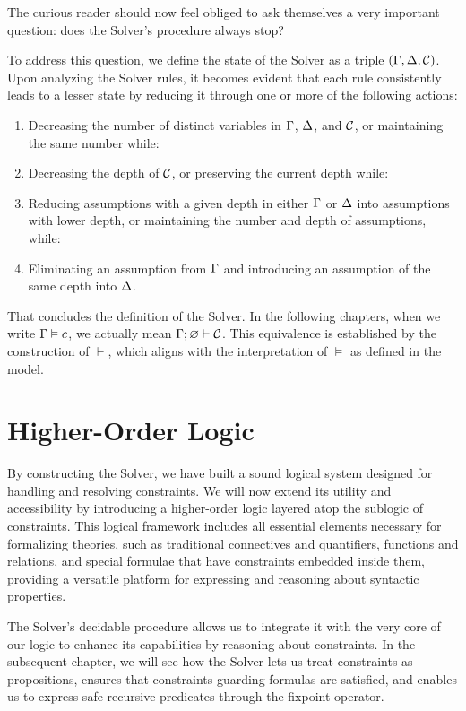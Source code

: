 \documentclass[english, mgr]{iithesis}
\newcommand{\solverRule}{\vdash}
\begin{document}
The curious reader should now feel obliged to ask themselves a very important question:
does the Solver's procedure always stop?

To address this question, we define the state of the Solver as a triple $(\Gamma, \Delta, \mathcal{C})$.
Upon analyzing the Solver rules, it becomes evident that each rule consistently
leads to a lesser state by reducing it through one or more of the following actions:
\begin{enumerate}[noitemsep]
  \item Decreasing the number of distinct variables in $\Gamma$, $\Delta$, and $\mathcal{C}$,
  or maintaining the same number while:
  \item Decreasing the depth of $\mathcal{C}$,
  or preserving the current depth while:
  \item Reducing assumptions with a given depth in either $\Gamma$ or $\Delta$ into assumptions with lower depth,
  or maintaining the number and depth of assumptions, while:
  \item Eliminating an assumption from $\Gamma$ and introducing an assumption of the same depth into $\Delta$.
\end{enumerate}

That concludes the definition of the Solver.
In the following chapters, when we write $\Gamma \vDash c$,
we actually mean $\cEnv ; \varnothing\solverRule \sconstr$.
This equivalence is established by the construction of $\solverRule$,
which aligns with the interpretation of $\vDash$ as defined in the model.

\chapter{Higher-Order Logic}
By constructing the Solver, we have built a sound logical system designed for handling and resolving constraints.
We will now extend its utility and accessibility
by introducing a higher-order logic layered atop the sublogic of constraints.
This logical framework includes all essential elements necessary for
formalizing theories, such as traditional connectives and quantifiers,
functions and relations, and special formulae that have constraints embedded inside them,
providing a versatile platform for expressing and reasoning about syntactic properties.

The Solver's decidable procedure allows us to integrate
it with the very core of our logic to enhance its capabilities
by reasoning about constraints.
In the subsequent chapter, we will see how the Solver lets us
treat constraints as propositions,
ensures that constraints guarding formulas are satisfied,
and enables us to express safe recursive predicates through the fixpoint operator.
\end{document}
